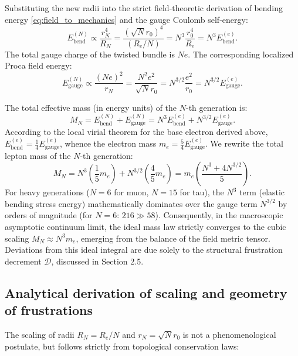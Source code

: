 \documentclass[11pt,a4paper]{article}
\begin{document}
Substituting the new radii into the strict field-theoretic derivation of bending energy \eqref{eq:field_to_mechanics} and the gauge Coulomb self-energy:
\begin{equation}
E_{\text{bend}}^{(N)} \propto \frac{r_N^4}{R_N} = \frac{(\sqrt{N} r_0)^4}{(R_e / N)} = N^3 \frac{r_0^4}{R_e} = N^3 E_{\text{bend}}^{(e)}.
\end{equation}
The total gauge charge of the twisted bundle is $N e$. The corresponding localized Proca field energy:
\begin{equation}
E_{\text{gauge}}^{(N)} \propto \frac{(Ne)^2}{r_N} = \frac{N^2 e^2}{\sqrt{N} r_0} = N^{3/2} \frac{e^2}{r_0} = N^{3/2} E_{\text{gauge}}^{(e)}.
\end{equation}

The total effective mass (in energy units) of the $N$-th generation is:
\begin{equation}
M_N = E_{\text{bend}}^{(N)} + E_{\text{gauge}}^{(N)} = N^3 E_{\text{bend}}^{(e)} + N^{3/2} E_{\text{gauge}}^{(e)}.
\end{equation}
According to the local virial theorem for the base electron derived above, $E_{\text{bend}}^{(e)} = \frac{1}{4} E_{\text{gauge}}^{(e)}$, whence the electron mass $m_e = \frac{5}{4} E_{\text{gauge}}^{(e)}$. 
We rewrite the total lepton mass of the $N$-th generation:
\begin{equation}
M_N = N^3 \left( \frac{1}{5} m_e \right) + N^{3/2} \left( \frac{4}{5} m_e \right) = m_e \left( \frac{N^3 + 4 N^{3/2}}{5} \right).
\end{equation}
For heavy generations ($N=6$ for muon, $N=15$ for tau), the $N^3$ term (elastic bending stress energy) mathematically dominates over the gauge term $N^{3/2}$ by orders of magnitude (for $N=6$: $216 \gg 58$).
Consequently, in the macroscopic asymptotic continuum limit, the ideal mass law strictly converges to the cubic scaling $M_N \approx N^3 m_e$, emerging from the balance of the field metric tensor. Deviations from this ideal integral are due solely to the structural frustration decrement $\mathcal{D}$, discussed in Section 2.5.
	
\subsection{Analytical derivation of scaling and geometry of frustrations}
The scaling of radii $R_N = R_e/N$ and $r_N = \sqrt{N}r_0$ is not a phenomenological postulate, but follows strictly from topological conservation laws:
\end{document}
